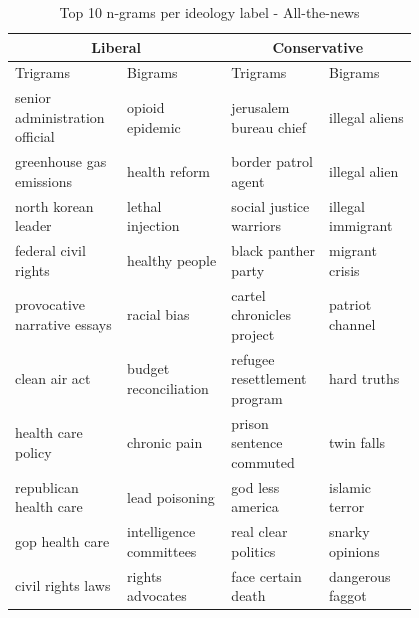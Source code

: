 \documentclass[10pt,a4paper,onecolumn]{article}
\begin{document}
\begin{table}[h!]
	\begin{center}
		\caption{Top 10 n-grams per ideology label - All-the-news}
		\label{tab:bigrams-atn}
		\begin{tabular}{p{0.2\linewidth}|p{0.2\linewidth}|p{0.2\linewidth}|p{0.2\linewidth}}
			\hline\hline
			\multicolumn{2}{c|}{\textbf{Liberal}} & \multicolumn{2}{c|}{\textbf{Conservative}} \\
			\hline
			Trigrams & Bigrams & Trigrams & Bigrams \\
			\hline
			senior administration official & opioid epidemic & jerusalem bureau chief & illegal aliens \\
			greenhouse gas emissions & health reform & border patrol agent & illegal alien \\
			north korean leader & lethal injection & social justice warriors & illegal immigrant \\
			federal civil rights & healthy people & black panther party & migrant crisis \\
			provocative narrative essays & racial bias & cartel chronicles project & patriot channel \\
			clean air act & budget reconciliation & refugee resettlement program & hard truths \\
			health care policy & chronic pain & prison sentence commuted & twin falls \\
			republican health care & lead poisoning & god less america & islamic terror \\
			gop health care & intelligence committees & real clear politics & snarky opinions \\
			civil rights laws & rights advocates & face certain death & dangerous faggot\footnotemark \\
			\hline\hline
		\end{tabular}
	\end{center}
\end{table}
\end{document}
